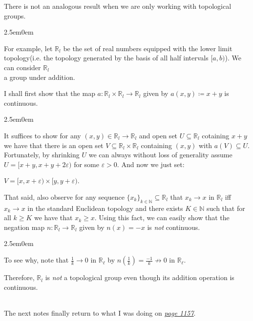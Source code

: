 \documentclass{book}
\newcommand{\inLinkRap}[2]{{\color{blue}\hyperlink{#1}{\textit{#2}}}}
\newcommand{\hTwo}{%
\color{Black}%
   \fontsize{13}{15}\selectfont%
}
\newcommand{\pracTwo}{
   \color{Orange}%
   \fontsize{12}{14}\selectfont%
}
\newcommand{\exPPP}{%
   \color{VioletRed}%
   \fontsize{12}{14}\selectfont%
}
\newenvironment{myIndent}{%
   \begin{adjustwidth}{2.5em}{0em}%
}{%
   \end{adjustwidth}%
}
\newcommand{\mySepTwo}[1][.]{%
   {\noindent\color{#1}{\rule{6.5in}{0.5mm}}}\\%
}
\newcommand{\retTwo}{\hfill\bigbreak}
\begin{document}
\hTwo There is not an analogous result when we are only working with topological groups.
\begin{myIndent}\pracTwo
	For example, let $\mathbb{R}_l$ be the set of real numbers equipped with the lower limit topology\newpage (i.e. the topology generated by the basis of all half intervals $[a, b)$). We can consider $\mathbb{R}_l$\\ a group under addition.\retTwo

	I shall first show that the map $a: \mathbb{R}_l \times \mathbb{R}_l \to \mathbb{R}_l$ given by $a(x, y) \coloneqq x + y$ is continuous.
	\begin{myIndent}\exPPP
		It suffices to show for any $(x, y) \in \mathbb{R}_l \to \mathbb{R}_l$ and open set $U \subseteq \mathbb{R}_l$ cotaining $x + y$ we have that there is an open set $V \subseteq \mathbb{R}_l \times \mathbb{R}_l$ containing $(x, y)$ with $a(V) \subseteq U$.  Fortunately, by shrinking $U$ we can always without loss of generality assume\\ $U = [x + y, x + y + 2\varepsilon)$ for some $\varepsilon > 0$. And now we just set:
		
		{\centering$V = [x, x + \varepsilon) \times [y, y + \varepsilon)$.\retTwo\par}
	\end{myIndent}

	That said, also observe for any sequence $\{x_k\}_{k \in \mathbb{N}} \subseteq \mathbb{R}_l$ that $x_k \to x$ in $\mathbb{R}_l$ iff $x_k \to x$ in the standard Euclidean topology and there exists $K \in \mathbb{N}$ such that for all $k \geq K$ we have that $x_k \geq x$. Using this fact, we can easily show that the negation map $n: \mathbb{R}_l \to \mathbb{R}_l$ given by $n(x) = -x$ is \textit{not} continuous.
	\begin{myIndent}\exPPP
		To see why, note that $\frac{1}{k} \to 0$ in $\mathbb{R}_\ell$ by $n(\frac{1}{k}) = \frac{-1}{k} \not\to 0$ in $\mathbb{R}_\ell$.\retTwo
	\end{myIndent}

	Therefore, $\mathbb{R}_l$ is \textit{not} a topological group even though its addition operation is\\ continuous.
\end{myIndent}

\hTwo\mySepTwo

\hypertarget{idk reference 9}{The} next notes finally return to what I was doing on \inLinkRap{Page 1157 reference}{page 1157}.\retTwo
\end{document}
